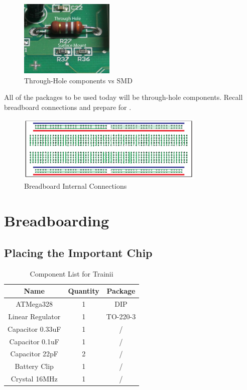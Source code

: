 \documentclass{article}
\begin{document}
\begin{figure}[!h]
    \center
    \includegraphics[width=0.4\textwidth,keepaspectratio]{throughvssmd}
    \caption {Through-Hole components vs SMD}
    \label{img:through_vs_smd}
\end{figure}

All of the packages to be used today will be through-hole components. Recall breadboard connections and prepare for . 

\begin{figure}[!h]
    \center
    \includegraphics[width=0.8\textwidth,keepaspectratio]{Breadboard_Internal_Connections}
    \caption {Breadboard Internal Connections}
    \label{img:bread_connections}
\end{figure}



\section{Breadboarding}

\subsection{Placing the Important Chip}
\begin{table}[!h]
    \center
    \begin{tabular}{c|c|c}
        Name              & Quantity & Package   \\
        \hline
        ATMega328         & 1        & DIP      \\
        Linear Regulator & 1        & TO-220-3  \\
        Capacitor 0.33uF  & 1        & /       \\
        Capacitor 0.1uF   & 1        & /      \\
        Capacitor 22pF    & 2        & /        \\
        Battery Clip      & 1        & /        \\
        Crystal 16MHz     & 1        & /     
    \end{tabular}
    \caption{Component List for Trainii}
    \label{table:componentList}
\end{table}
\end{document}

